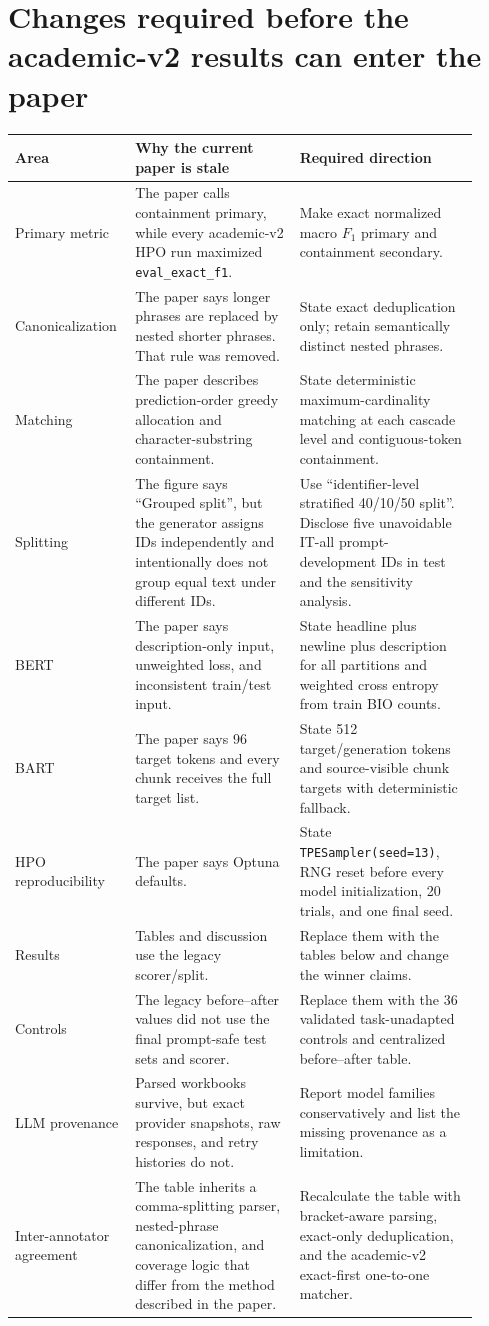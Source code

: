 \documentclass[11pt,a4paper]{article}
\newcommand{\Code}[1]{\texttt{#1}}
\begin{document}
\section{Changes required before the academic-v2 results can enter the paper}
\begin{longtable}{p{0.21\linewidth}p{0.34\linewidth}p{0.37\linewidth}}
\toprule
Area & Why the current paper is stale & Required direction \\
\midrule
Primary metric & The paper calls containment primary, while every academic-v2 HPO run maximized \Code{eval\_exact\_f1}. & Make exact normalized macro $F_1$ primary and containment secondary. \\
Canonicalization & The paper says longer phrases are replaced by nested shorter phrases. That rule was removed. & State exact deduplication only; retain semantically distinct nested phrases. \\
Matching & The paper describes prediction-order greedy allocation and character-substring containment. & State deterministic maximum-cardinality matching at each cascade level and contiguous-token containment. \\
Splitting & The figure says ``Grouped split'', but the generator assigns IDs independently and intentionally does not group equal text under different IDs. & Use ``identifier-level stratified 40/10/50 split''. Disclose five unavoidable IT-all prompt-development IDs in test and the sensitivity analysis. \\
BERT & The paper says description-only input, unweighted loss, and inconsistent train/test input. & State headline plus newline plus description for all partitions and weighted cross entropy from train BIO counts. \\
BART & The paper says 96 target tokens and every chunk receives the full target list. & State 512 target/generation tokens and source-visible chunk targets with deterministic fallback. \\
HPO reproducibility & The paper says Optuna defaults. & State \Code{TPESampler(seed=13)}, RNG reset before every model initialization, 20 trials, and one final seed. \\
Results & Tables and discussion use the legacy scorer/split. & Replace them with the tables below and change the winner claims. \\
Controls & The legacy before--after values did not use the final prompt-safe test sets and scorer. & Replace them with the 36 validated task-unadapted controls and centralized before--after table. \\
LLM provenance & Parsed workbooks survive, but exact provider snapshots, raw responses, and retry histories do not. & Report model families conservatively and list the missing provenance as a limitation. \\
Inter-annotator agreement & The table inherits a comma-splitting parser, nested-phrase canonicalization, and coverage logic that differ from the method described in the paper. & Recalculate the table with bracket-aware parsing, exact-only deduplication, and the academic-v2 exact-first one-to-one matcher. \\
\bottomrule
\end{longtable}
\end{document}
